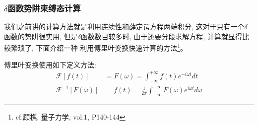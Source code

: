 \documentclass[a4paper,zihao=-4,linespread=1]{ctexrep}
\begin{document}
    \subsubsection*{$\delta$函数势阱束缚态计算}
    我们之前讲的计算方法就是利用连续性和薛定谔方程两端积分, 这对于只有一个$\delta$函数的势阱很实用, 但是$\delta$函数数目较多时, 由于还要分段求解方程, 计算就显得比较繁琐了, 下面介绍一种
    利用傅里叶变换快速计算的方法\footnote{cf.顾樵, 量子力学, vol.1, P140-144}。

    傅里叶变换使用如下定义方法:
    \begin{equation}
        \label{傅里叶变换}
        \begin{aligned}
        \mathscr{F}[f(t)] &=F(\omega)=\int_{-\infty}^{+\infty} f(t) e^{-i \omega t} d t \\
        \mathscr{F}^{-1}[F(\omega)] &=f(t)=\frac{1}{2 \pi} \int_{-\infty}^{+\infty} F(\omega) e^{i \omega t} d \omega
        \end{aligned}
    \end{equation}
\end{document}
